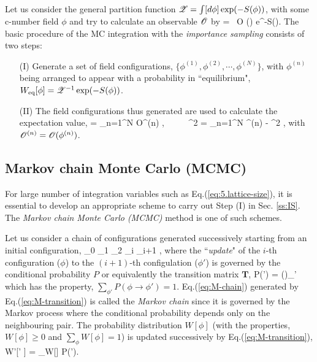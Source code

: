      Let us consider the general partition function ${\cal Z}= \int [d\phi] \exp(-S(\phi)) $,
    with some c-number field $\phi$  and try to calculate  an observable ${\cal O} $ by
  \beq
   \rangle =  \int [d \phi] \ {\cal O} (\phi) e^{-S(\phi)}.
  \eeq   
  The basic procedure of the MC integration
  with the {\it importance sampling} consists of two steps:
  \begin{enumerate}
  \item[(I)]   Generate a set of field configurations, $ \{  \phi^{(1)}, \phi^{(2)}, \cdots, \phi^{(N)} \}$, 
with $\phi^{(n)}$  being arranged to appear with 
 a probability in ``equilibrium", $W_{\rm eq}[\phi]={\cal Z}^{-1} \exp (-S(\phi))$.
 \item[(II)]  The field configurations thus generated 
 are  used to calculate the expectation value,
 \beq
\label{eq:5.obs-average}
 \rangle = \sum_{n=1}^N {\cal O}^{(n)}
\pm {}, \ \ \ \ \ 
\sigma^2 =   \sum_{n=1}^N ^{(n)} -  \rangle \rangle^2 ,
\eeq
with ${\cal O}^{(n)}={\cal O}(\phi^{(n)})$.
\end{enumerate}

\subsection{Markov chain Monte Carlo (MCMC)}
  
 For large  number of integration variables such as Eq.(\ref{eq:5.lattice-size}), 
 it  is essential to develop an appropriate scheme to carry out  Step (I) in Sec. \ref{ss:IS}. 
 The {\it Markov chain Monte Carlo (MCMC)}  method is one of such schemes. 
    
Let us consider a chain of configurations  generated successively starting from an
initial configuration,
\beq
\label{eq:M-chain}
 \phi_{0} \rightarrow  \phi_{1} \rightarrow \phi_{2}
 \rightarrow \cdots \rightarrow \phi_{i} \rightarrow  \phi_{i+1}
\rightarrow \cdots ,  
\eeq
where the ``{\it update}" of the $i$-th configuration ($\phi$)  to
the $(i+1)$-th configulation ($\phi'$)  is governed by the conditional probability
$P$ or equivalently  the transition matrix $\mathbf{T}$, 
\beq
\label{eq:M-transition}
P(\phi \rightarrow \phi') = ()_{\phi \phi'} 
\eeq
which has the property, $\sum_{\phi'} P(\phi \rightarrow \phi')=1$.
Eq.(\ref{eq:M-chain}) generated by Eq.(\ref{eq:M-transition}) is called the {\it Markov chain} since
it is governed by the Markov process where the conditional probability depends only on the 
neighbouring pair. The probability distribution $W[\phi]$ (with the properties, $W[\phi] \ge 0$ and 
$\sum_{\phi} W[\phi]=1$) is updated successively by Eq.(\ref{eq:M-transition}),
\beq
\label{eq:5.MC-update}
W'[\phi' ] =  \sum_\phi  W[\phi] P(\phi \rightarrow \phi'). 
\eeq

